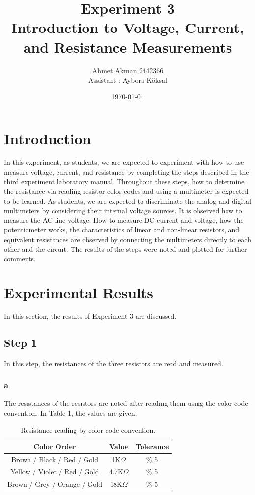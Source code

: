 \documentclass[letterpaper,12pt]{article}
\begin{document}
\title{Experiment 3 \protect\\Introduction to Voltage, Current, and Resistance Measurements}
\author{Ahmet Akman 2442366 \protect\\ Assistant : Aybora Köksal}
\date{\today}
\maketitle



\section{Introduction} 
In this experiment, as students, we are expected to experiment with how to use measure voltage, current, and resistance by completing the steps described in the third experiment laboratory manual. Throughout these steps, how to determine the resistance via reading resistor color codes and using a multimeter is expected to be learned. As students, we are expected to discriminate the analog and digital multimeters by considering their internal voltage sources. It is observed how to measure the AC line voltage. How to measure DC current and voltage, how the potentiometer works, the characteristics of linear and non-linear resistors, and equivalent resistances are observed by connecting the multimeters directly to each other and the circuit. The results of the steps were noted and plotted for further comments.
\section{Experimental Results}
In this section, the results of Experiment 3 are discussed.
\subsection{Step 1}
In this step, the resistances of the three resistors are read and measured. 
\subsubsection{a} 
The resistances of the resistors are noted after reading them using the color code convention. In Table 1, the values are given. 
\begin{table}[H]
\begin{center}
	\begin{tabular}{||c | c | c||} 
	 \hline
	 Color Order & Value & Tolerance \\ [0.5ex] 
	 \hline\hline
	 Brown / Black / Red / Gold & 1K\( \Omega \) & \( \% \) 5  \\ 
	 \hline
	 Yellow / Violet / Red / Gold & 4.7K\( \Omega \) & \( \% \) 5   \\
	 \hline
	 Brown / Grey / Orange / Gold & 18K\( \Omega \) & \( \% \) 5  \\ [1ex] 
	 \hline
	\end{tabular}
\end{center}
\caption{Resistance reading by color code convention.}
\end{table}
\end{document}
